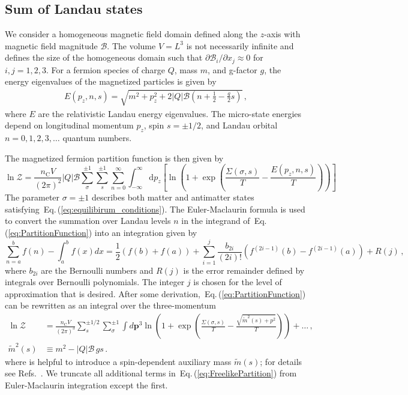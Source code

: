 \documentclass[epjST]{svjour}
\newcommand{\req}[1]{Eq.\,(\ref{#1})}
\begin{document}
\subsection{Sum of Landau states}
\label{sec:Landau}
We consider a homogeneous magnetic field domain defined along the $z$-axis with magnetic field magnitude $\mathcal{B}$. The volume $V=L^{3}$ is not necessarily infinite and defines the size of the homogeneous domain such that $\partial\mathcal{B}_{i}/\partial x_{j}\approx0$ for \(i,j=1,2,3\). For a fermion species of charge $Q$, mass $m$, and g-factor $g$, the energy eigenvalues of the magnetized particles is given by~\cite{Steinmetz:2018ryf}
\begin{align}
\label{eq:energystates}
E(p_{z},n,s)=\sqrt{m^{2}+p_{z}^{2}+2|Q|\mathcal{B}\left(n+\frac{1}{2}-\frac{g}{2}s\right)}\,,
\end{align}
where $E$ are the relativistic Landau energy eigenvalues. The micro-state energies depend on longitudinal momentum \(p_{z}\), spin $s=\pm1/2$, and Landau orbital $n=0,1,2,3,\ldots$ quantum numbers. 

{\color{blue} The magnetized fermion partition function is then given by
\begin{equation}
\label{eq:PartitionFunction}
\ln\mathcal{Z}=\frac{n_{\mathrm{C}}V}{(2\pi)^{2}}|Q|\mathcal{B}\sum_{\sigma}^{\pm1}\sum_{s}^{\pm1}\sum_{n=0}^{\infty}\int_{-\infty}^{\infty}\mathrm{d}p_{z}\left[\ln\left(1+\exp\left(\frac{\Sigma(\sigma,s)}{T}-\frac{E(p_{z},n,s)}{T}\right)\right)\right]\,
\end{equation}
}The parameter \(\sigma=\pm1\) describes both matter and antimatter states satisfying~\req{eq:equilibirum_conditions}. {\color{blue}The Euler-Maclaurin formula is used to convert the summation over Landau levels $n$ in the integrand of~\req{eq:PartitionFunction} into an integration given by
\begin{equation}
\label{eq:EulerMaclaurin}\sum^{b}_{n=a}f(n)-\int^{b}_{a}f(x)dx = \frac{1}{2}\left(f(b)+f(a)\right)
+\sum_{i=1}^{j}\frac{b_{2i}}{(2i)!}\left(f^{(2i-1)}(b)-f^{(2i-1)}(a)\right)+R(j)\,,
\end{equation}
where $b_{2i}$ are the Bernoulli numbers and $R(j)$ is the error remainder defined by integrals over Bernoulli polynomials. The integer $j$ is chosen for the level of approximation that is desired. After some derivation,~\req{eq:PartitionFunction} can be rewritten as an integral over the three-momentum
\begin{align}
\label{eq:FreelikePartition}
\ln\mathcal{Z} &= \frac{n_\mathrm{C}V}{(2\pi)^{3}}\sum_{s}^{\pm1/2}\sum_{\sigma}^{\pm1}\int d\mathbf{p}^{3}\ln\left(1+\exp{\left(\frac{\Sigma(\sigma,s)}{T}-\frac{\sqrt{\tilde{m}^2(s)+p^{2}}}{T}\right)}\right)+\ldots\,,\\
\label{eq:spinmass}
\tilde{m}^{2}(s) &\equiv m^{2} - |Q|\mathcal{B}\,g s\,.
\end{align}
where} is helpful to introduce a spin-dependent auxiliary mass \(\tilde{m}(s)\); {\color{blue}for details see Refs.~\cite{Steinmetz:2023nsc,Steinmetz:2023ucp}. We truncate all additional terms in~\req{eq:FreelikePartition} from Euler-Maclaurin integration except the first.} 
\end{document}
